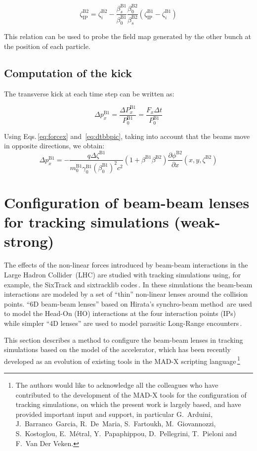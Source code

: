 \begin{equation}
\zeta^\text{B2}_\text{IP}
=
\zeta^\text{B2}_i
-\frac{\beta^\text{B1}_s}{\beta_0^\text{B1}}
\frac{\beta_0^\text{B2}}{\beta^\text{B2}_s}
\left(\zeta^\text{B1}_\text{IP} -  \zeta^\text{B1}_i \right)
\end{equation}

This relation can be used to probe the field map generated by the other bunch at the position of each particle.

\subsection{Computation of the kick}

The transverse kick at each time step can be written as:

\begin{equation}
\Delta p^\text{B1}_x = \frac{\Delta P^\text{B1}_x}{P^\text{B1}_0} = \frac{F_x \Delta t}{P^\text{B1}_0}
\end{equation}

Using Eqs.\,\ref{eq:forcex} and~\ref{eq:dtbbpic}, taking into account that the beams move in opposite directions, we obtain:
\begin{equation}
\Delta p^\text{B1}_x = 
-\frac{q\Delta \zeta^\text{B1}}
{m_0^\text{B1}\gamma^\text{B1}_0(\beta^\text{B1}_0)^2 c^2}
\left(1+\beta^\text{B1}  \beta^\text{B2}\right) 
\frac{\partial \phi^\text{B2}}{\partial x}(x, y, \zeta^\text{B2})
\end{equation}

\section{Configuration of beam-beam lenses for tracking simulations (weak-strong)}

The effects of the non-linear forces introduced by beam-beam interactions in the Large Hadron Collider~(LHC) are studied with tracking simulations using, for example, the SixTrack and sixtracklib codes\,\cite{sixtracksite, sixtracklibrepo}. In these simulations the beam-beam interactions are modeled by a set of ``thin'' non-linear lenses around the collision points.
 ``6D beam-beam lenses'' based on Hirata's synchro-beam method\,\cite{hirata, bb6dnote, bb6dslides} are used to model the Head-On (HO) interactions at the four interaction points (IPs) while simpler ``4D lenses'' are used to model parasitic Long-Range encounters\,\cite{casbeambeam}.
 
This section describes a method to configure the beam-beam lenses in tracking simulations based on the model of the accelerator, which has been recently developed as an evolution of existing tools in the MAD-X scripting language\,\cite{bbmacrorepo}\footnote{
The authors would like to acknowledge all the colleagues who  have contributed to the development of the MAD-X tools for the configuration of tracking simulations, on which the present work is largely based, and have provided important input and support, in particular G.~Arduini, J.~Barranco~Garcia, R.~De~Maria, S.~Fartoukh, M.~Giovannozzi, S.~Kostoglou, E.~M\'etral,  Y.~Papaphippou, D.~Pellegrini, T.~Pieloni and F.~Van Der Veken.}

